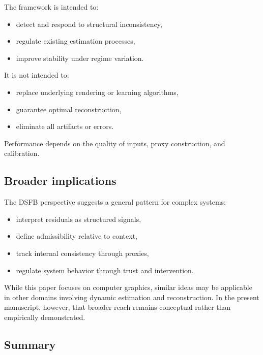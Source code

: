 \documentclass[11pt]{article}
\theoremstyle{definition}
\theoremstyle{plain}
\begin{document}
The framework is intended to:

\begin{itemize}[leftmargin=1.5em]
    \item detect and respond to structural inconsistency,
    \item regulate existing estimation processes,
    \item improve stability under regime variation.
\end{itemize}

It is not intended to:

\begin{itemize}[leftmargin=1.5em]
    \item replace underlying rendering or learning algorithms,
    \item guarantee optimal reconstruction,
    \item eliminate all artifacts or errors.
\end{itemize}

Performance depends on the quality of inputs, proxy construction, and calibration.


\subsection{Broader implications}

The DSFB perspective suggests a general pattern for complex systems:

\begin{itemize}[leftmargin=1.5em]
    \item interpret residuals as structured signals,
    \item define admissibility relative to context,
    \item track internal consistency through proxies,
    \item regulate system behavior through trust and intervention.
\end{itemize}

While this paper focuses on computer graphics, similar ideas may be applicable in other domains involving dynamic estimation and reconstruction. In the present manuscript, however, that broader reach remains conceptual rather than empirically demonstrated.


\subsection{Summary}
\end{document}
